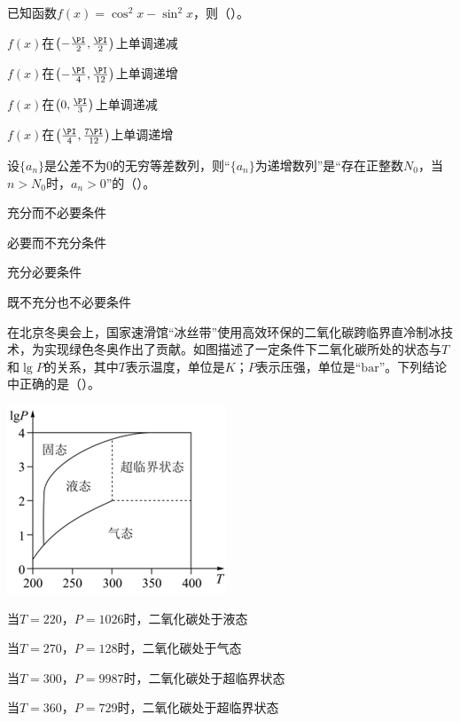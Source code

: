 \documentclass[fontset=founder]{ucedubook}
\let\pi=\PI
\begin{document}
\begin{ti}[.16]
  已知函数$f(x)=\cos^2 x-\sin^2 x$，则（\qquad）。

  \begin{choices}
    \item $f(x)$在$\left(-\frac{\pi}{2},\frac{\pi}{2}\right)$上单调递减
    \item $f(x)$在$\left(-\frac{\pi}{4},\frac{\pi}{12}\right)$上单调递增
    \item $f(x)$在$\left(0,\frac{\pi}{3}\right)$上单调递减
    \item $f(x)$在$\left(\frac{\pi}{4},\frac{7\pi}{12}\right)$上单调递增
  \end{choices}
\end{ti}


\begin{ti}[.16]
  设$\{a_n\}$是公差不为$0$的无穷等差数列，则“$\{a_n\}$为递增数列”是“存在正整数$N_0$，当$n>N_0$时，$a_n>0$”的（\qquad）。

  \begin{choices}
    \item 充分而不必要条件
    \item 必要而不充分条件
    \item 充分必要条件
    \item 既不充分也不必要条件
  \end{choices}
\end{ti}


\begin{ti}[.25]
  在北京冬奥会上，国家速滑馆“冰丝带”使用高效环保的二氧化碳跨临界直冷制冰技术，为实现绿色冬奥作出了贡献。如图描述了一定条件下二氧化碳所处的状态与$T$和$\lg P$的关系，其中$T$表示温度，单位是$K$；$P$表示压强，单位是“$\mathrm{bar}$”。下列结论中正确的是（\qquad）。

  \hfill\includegraphics{北京-7.png}

  \begin{choices}
    \item 当$T=220$，$P=1026$时，二氧化碳处于液态
    \item 当$T=270$，$P=128$时，二氧化碳处于气态
    \item 当$T=300$，$P=9987$时，二氧化碳处于超临界状态
    \item 当$T=360$，$P=729$时，二氧化碳处于超临界状态
  \end{choices}
\end{ti}
\end{document}
